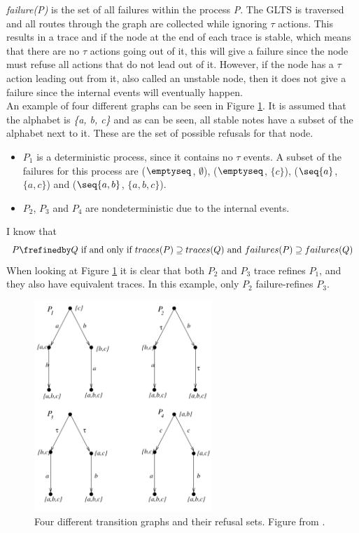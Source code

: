 \textit{failure(P)} is the set of all failures within the process \textit{P}. The GLTS is traversed and all routes through the graph are collected while ignoring $\tau$ actions. This results in a trace and if the node at the end of each trace is stable, which means that there are no $\tau$ actions going out of it, this will give a failure since the node must refuse all actions that do not lead out of it. However, if the node has a $\tau$ action leading out from it, also called an unstable node, then it does not give a failure since the internal events will eventually happen.\\

An example of four different graphs can be seen in Figure \ref{fig:failures_graph}. It is assumed that the alphabet is \textit{\{a, b, c\}} and as can be seen, all stable notes have a subset of the alphabet next to it. These are the set of possible refusals for that node.
\begin{itemize}
    \item $P_1$ is a deterministic process, since it contains no $\tau$ events. A subset of the failures for this process are ($\emptyseq$, $\emptyset$), ($\emptyseq$, $\{c\}$), ($\seq{a}$, $\{a,c\}$) and ($\seq{a,b}$, $\{a,b,c\}$).
    \item $P_2$, $P_3$ and $P_4$ are nondeterministic due to the internal events.
\end{itemize}
I know that $$P \frefinedby Q \text{ if and only if } traces(P) \supseteq traces(Q) \text{ and } failures(P) \supseteq failures(Q)$$
When looking at Figure \ref{fig:failures_graph} it is clear that both $P_2$ and $P_3$ trace refines $P_1$, and they also have equivalent traces. In this example, only $P_2$ failure-refines $P_3$.
\begin{figure}[h]
\centering
\includegraphics[width=0.6\textwidth]{figures/failures_graph.jpg}
\caption{Four different transition graphs and their refusal sets. Figure from \cite{Roscoe2010}.}
\label{fig:failures_graph}
\end{figure}
